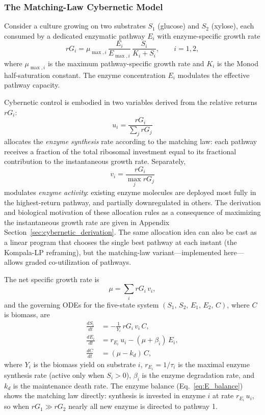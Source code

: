 \subsubsection*{The Matching-Law Cybernetic Model}

Consider a culture growing on two substrates $S_1$ (glucose) and $S_2$
(xylose), each consumed by a dedicated enzymatic pathway $E_i$ with
enzyme-specific growth rate
\begin{equation}\label{eq:rGi}
  rG_i = \mu_{\max,i}\,\frac{E_i}{E_{\max,i}}\,\frac{S_i}{K_i + S_i},
  \qquad i = 1,2,
\end{equation}
where $\mu_{\max,i}$ is the maximum pathway-specific growth rate and $K_i$ is
the Monod half-saturation constant.  The enzyme concentration $E_i$ modulates
the effective pathway capacity.

Cybernetic control is embodied in two variables derived from the relative
returns $rG_i$:
\begin{equation}\label{eq:ui}
  u_i = \frac{rG_i}{\sum_j rG_j}
\end{equation}
allocates the \emph{enzyme synthesis} rate according to the matching law:
each pathway receives a fraction of the total ribosomal investment equal to
its fractional contribution to the instantaneous growth rate.  Separately,
\begin{equation}\label{eq:vi}
  v_i = \frac{rG_i}{\max_j rG_j}
\end{equation}
modulates \emph{enzyme activity}: existing enzyme molecules are deployed most
fully in the highest-return pathway, and partially downregulated in others.
The derivation and biological motivation of these allocation rules as a
consequence of maximizing the instantaneous growth rate are given in
Appendix Section~\ref{sec:cybernetic_derivation}.  The same allocation
idea can also be cast as a linear program that chooses the single best
pathway at each instant (the Kompala-LP reframing), but the matching-law
variant---implemented here---allows graded co-utilization of pathways.

The net specific growth rate is
\begin{equation}\label{eq:mu_net}
  \mu = \sum_i rG_i\,v_i,
\end{equation}
and the governing ODEs for the five-state system
$(S_1,\,S_2,\,E_1,\,E_2,\,C)$, where $C$ is biomass, are
\begin{align}
  \frac{dS_i}{dt} &= -\frac{1}{Y_i}\,rG_i\,v_i\,C, \label{eq:S_balance}\\
  \frac{dE_i}{dt} &= r_{E_i}\,u_i - (\mu + \beta_i)\,E_i, \label{eq:E_balance}\\
  \frac{dC}{dt}   &= (\mu - k_d)\,C, \label{eq:C_balance}
\end{align}
where $Y_i$ is the biomass yield on substrate $i$, $r_{E_i} = 1/\tau_i$
is the maximal enzyme synthesis rate (active only when $S_i > 0$),
$\beta_i$ is the enzyme degradation rate, and $k_d$ is the maintenance
death rate.  The enzyme balance (Eq.~\ref{eq:E_balance}) shows the matching
law directly: synthesis is invested in enzyme $i$ at rate $r_{E_i}\,u_i$,
so when $rG_1 \gg rG_2$ nearly all new enzyme is directed to pathway 1.

